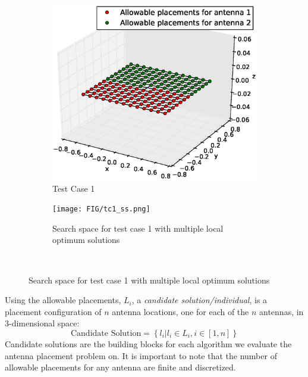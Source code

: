\documentclass[conference]{IEEEtran}
\begin{document}
\begin{figure}%
    \centering
    \begin{subfigure}{\columnwidth}
        \includegraphics[width=\columnwidth]{FIG/tc_1_figure}%
        \caption{Test Case 1}%
    \label{fig:tc1_figure}%
    \end{subfigure}\hfill%
    \begin{subfigure}{\columnwidth}
        \texttt{[image: FIG/tc1\_ss.png]}%
        \caption{Search space for test case 1 with multiple local optimum solutions}%
        \label{fig:tc1_ss}%
    \end{subfigure}\hfill\\
\end{figure}


%
Using the allowable placements, $L_i$, a \textit{candidate solution/individual}, is a placement configuration of $n$ antenna locations, one for each of the $n$ antennas, in 3-dimensional space:
\[
    \text{Candidate Solution}  = \left\{l_i | l_i \in L_i, i \in [1,n]\right\}
\]
Candidate solutions are the building blocks for each algorithm we evaluate the antenna placement problem on. It is important to note that the number of allowable placements for any antenna are finite and discretized. 
\end{document}
